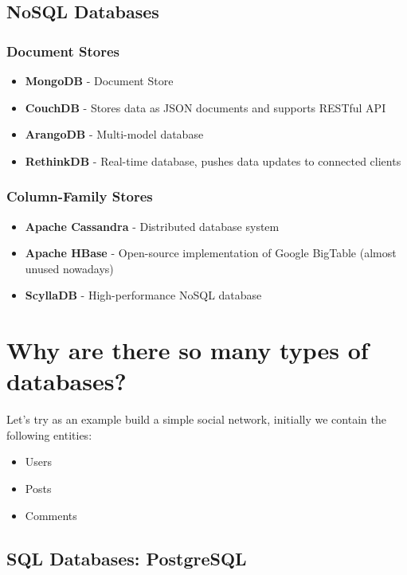 \documentclass{article}
\begin{document}
\subsection{NoSQL Databases}
\noindent

\subsubsection{Document Stores}
\noindent

\begin{itemize}
  \item \textbf{MongoDB} - Document Store
  \item \textbf{CouchDB} - Stores data as JSON documents and supports RESTful API
  \item \textbf{ArangoDB} - Multi-model database
  \item \textbf{RethinkDB} - Real-time database, pushes data updates to connected clients
\end{itemize}

\subsubsection{Column-Family Stores}
\noindent

\begin{itemize}
  \item \textbf{Apache Cassandra} - Distributed database system
  \item \textbf{Apache HBase} - Open-source implementation of Google BigTable (almost unused nowadays)
  \item \textbf{ScyllaDB} - High-performance NoSQL database
\end{itemize}

\section{Why are there so many types of databases?}
\noindent

Let's try as an example build a simple social network, initially we contain the following entities:

\begin{itemize}
  \item Users
  \item Posts
  \item Comments
\end{itemize}

\subsection{SQL Databases: PostgreSQL}
\noindent
\end{document}
